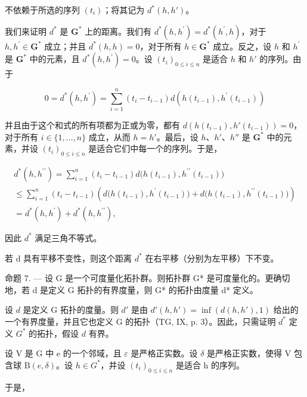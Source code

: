 不依赖于所选的序列 \((t_{i})\)；将其记为 \(d^{*}(h,h')\)。

我们来证明 \(d^{*}\) 是 \(\mathbf{G}^{*}\) 上的距离。我们有 \(d^{*}(h,h^{\prime}) = d^{*}(h^{\prime},h)\)，对于 \(h, h^{\prime} \in \mathbf{G}^{*}\) 成立；并且 \(d^{*}(h,h) = 0\)，对于所有 \(h \in \mathbf{G}^{*}\) 成立。反之，设 \(h\) 和 \(h^{\prime}\) 是 \(\mathbf{G}^{*}\) 中的元素，且 \(d^{*}(h,h^{\prime}) = 0\)。设 \((t_{i})_{0\leqslant i\leqslant n}\) 是适合 \(h\) 和 \(h'\) 的序列。由于

\[
0 = d ^ {*} (h, h ^ {\prime}) = \sum_ {i = 1} ^ {n} \left(t _ {i} - t _ {i - 1}\right) d \left(h \left(t _ {i - 1}\right), h ^ {\prime} \left(t _ {i - 1}\right)\right)
\]

并且由于这个和式的所有项都为正或为零，都有 \(d(h(t_{i-1}), h'(t_{i-1})) = 0\)，对于所有 \(i \in \{1, \ldots, n\}\) 成立，从而 \(h = h'\)。最后，设 \(h\)、\(h'\)、\(h''\) 是 \(\mathbf{G}^*\) 中的元素，并设 \((t_i)_{0 \leqslant i \leqslant n}\) 是适合它们中每一个的序列。于是，

\[
\begin{array}{l} d ^ {*} (h, h ^ {\prime \prime}) = \sum_ {i = 1} ^ {n} (t _ {i} - t _ {i - 1}) d \big (h (t _ {i - 1}), h ^ {\prime \prime} (t _ {i - 1}) \big) \\ \leqslant \sum_ {i = 1} ^ {n} (t _ {i} - t _ {i - 1}) \left(d \big (h (t _ {i - 1}), h ^ {\prime} (t _ {i - 1}) \big) + d \big (h (t _ {i - 1}), h ^ {\prime \prime} (t _ {i - 1}) \big)\right) \\ = d ^ {*} (h, h ^ {\prime}) + d ^ {*} (h, h ^ {\prime \prime}), \end{array}
\]

因此 \(d^{*}\) 满足三角不等式。

若 d 具有平移不变性，则这个距离 \(d^{*}\) 在右平移（分别为左平移）下不变。

命题 7. --- 设 G 是一个可度量化拓扑群。则拓扑群 G* 是可度量化的。更确切地，若 d 是定义 G 拓扑的有界度量，则 G* 的拓扑由度量 d* 定义。

设 \(d\) 是定义 G 拓扑的度量。则 \(d'\) 是由 \(d'(h,h') = \inf (d(h,h'),1)\) 给出的一个有界度量，并且它也定义 G 的拓扑（TG, IX, p. 3）。因此，只需证明 \(d^{*}\) 定义 \(G^{*}\) 的拓扑，假设 \(d\) 有界。

设 V 是 G 中 e 的一个邻域，且 \(\varepsilon\) 是严格正实数。设 \(\delta\) 是严格正实数，使得 V 包含球 \(\mathrm{B}(e,\delta)\)。设 \(h \in G^{*}\)，并设 \((t_{i})_{0 \leqslant i \leqslant n}\) 是适合 h 的序列。

于是，

